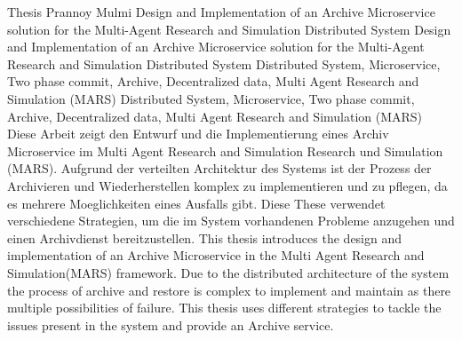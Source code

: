 													{ Thesis }																			%
													{Prannoy Mulmi}														%
													{Design and Implementation of an Archive Microservice solution for the Multi-Agent Research and
													Simulation Distributed System}											  %
													{Design and Implementation of an Archive Microservice solution for the Multi-Agent Research and
													Simulation Distributed System}							%
													{Distributed System, Microservice, Two phase commit, Archive, Decentralized data, Multi Agent Research and Simulation (MARS)}																		%
													{Distributed System, Microservice, Two phase commit, Archive, Decentralized data, Multi Agent Research and Simulation (MARS)}																			%
													{Diese Arbeit zeigt den Entwurf und die Implementierung eines Archiv Microservice im Multi Agent Research and Simulation
													Research und Simulation (MARS). Aufgrund der verteilten Architektur des Systems ist der Prozess der
													Archivieren und Wiederherstellen komplex zu implementieren und zu pflegen, da es mehrere Moeglichkeiten eines Ausfalls gibt. Diese These
													verwendet verschiedene Strategien, um die im System vorhandenen Probleme anzugehen und einen Archivdienst bereitzustellen.}	
													{This thesis introduces the design and implementation of an Archive Microservice in the Multi Agent
													Research and Simulation(MARS) framework. Due to the distributed architecture of the system the process of
													archive and restore is complex to implement and maintain as there multiple possibilities of failure. This thesis
													uses different strategies to tackle the issues present in the system and provide an Archive service.}	

												
  									  													


	  																							

